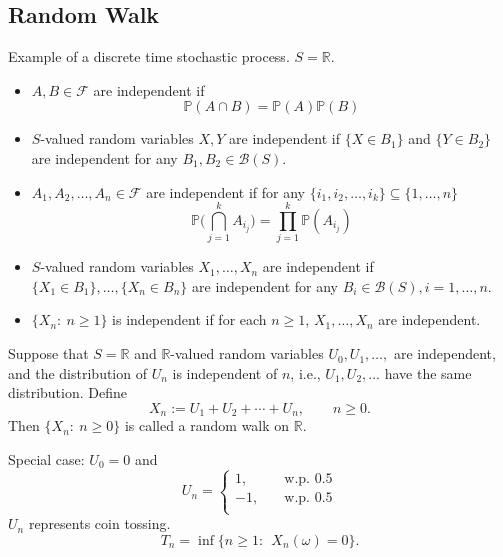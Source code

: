 \subsection{Random Walk}
Example of a discrete time stochastic process.
$S=\mathbb{R}$.

\begin{definition}
\begin{itemize}
\item
$A,B\in\mathcal{F}$ are independent if 
\[
\mathbb{P}(A\cap B) = \mathbb{P}(A)\mathbb{P}(B)
\]
\item
$S$-valued random variables $X,Y$ are independent if
$\{X\in B_1\}$ and $\{Y\in B_2\}$ are independent for any $B_1,B_2\in\mathcal{B}(S)$.
\item
$A_1,A_2,\dots,A_n\in\mathcal{F}$ are independent if 
for any $\{i_1,i_2,\dots,i_k\}\subseteq\{1,\dots,n\}$
\[
\mathbb{P}\bigg(
\bigcap_{j=1}^kA_{i_{j}}
\bigg)
=\prod_{j=1}^k\mathbb{P}(A_{i_{j}})
\]
\item
$S$-valued random variables $X_1,\ldots,X_n$ are independent if $\{X_1\in B_1\},\ldots,\{X_n\in B_n\}$ are independent for any $B_i\in\mathcal{B}(S), i=1,\ldots,n$.
\item
$\{X_n:~n\ge1\}$ is independent if for each $n\ge1$, 
$X_1,\ldots,X_n$ are independent. 
\end{itemize}
\end{definition}

Suppose that 
$S=\mathbb{R}$ and $\mathbb{R}$-valued random variables $U_0,U_1,\ldots,$ are independent,
and the distribution of $U_n$ is independent of $n$, i.e., $U_1,U_2,\dots$ have the same distribution.
Define 
\[
X_n:=U_1+U_2+\cdots+U_n,\qquad
n\ge0.
\]
Then $\{X_n:~ n\ge0\}$ is called a random walk on $\mathbb{R}$.

Special case: $U_0=0$ and
\[
U_n=\left\{
\begin{aligned}
1,&\quad\text{w.p. $0.5$}\\
-1,&\quad\text{w.p. $0.5$}\\
\end{aligned}
\right.
\]
$U_n$ represents coin tossing.
\[
T_n=\inf\{n\ge1:~~X_n(\omega)=0\}.
\]















